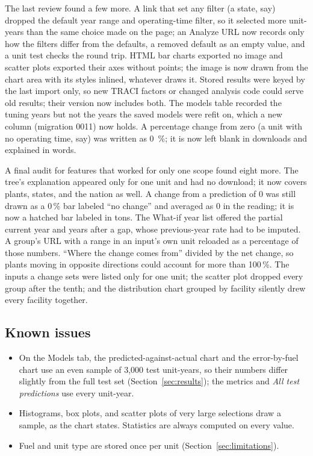 \documentclass[11pt,a4paper]{article}
\begin{document}
The last review found a few more. A link that set any filter (a state, say) dropped the default
year range and operating-time filter, so it selected more unit-years than the same choice made on
the page; an Analyze URL now records only how the filters differ from the defaults, a removed
default as an empty value, and a unit test checks the round trip. HTML bar charts exported no
image and scatter plots exported their axes without points; the image is now drawn from the
chart area with its styles inlined, whatever draws it. Stored results were keyed by the last
import only, so new TRACI factors or changed analysis code could serve old results; their
version now includes both. The models table recorded the tuning years but not the years the
saved models were refit on, which a new  column (migration 0011) now holds.
A percentage change from zero (a unit with no operating time, say) was written as 0~\%; it
is now left blank in downloads and explained in words.

A final audit for features that worked for only one scope found eight more. The tree's
explanation appeared only for one unit and had no download; it now covers plants, states, and the
nation as well. A change from a prediction of 0 was still drawn as a 0\,\% bar labeled ``no
change'' and averaged as 0 in the reading; it is now a hatched bar labeled in tons. The What-if
year list offered the partial current year and years after a gap, whose previous-year rate had
to be imputed. A group's URL with a range in an input's own unit reloaded as a percentage of
those numbers. ``Where the change comes from'' divided by the net change, so plants moving in
opposite directions could account for more than 100\,\%. The inputs a change sets were listed
only for one unit; the scatter plot dropped every group after the tenth; and the distribution chart grouped
by facility silently drew every facility together.

\subsection{Known issues}
\label{sec:known}

\begin{itemize}
  \item On the Models tab, the predicted-against-actual chart and the error-by-fuel chart use
        an even sample of 3{,}000 test unit-years, so their numbers differ slightly from the full
        test set (Section~\ref{sec:results}); the metrics and \emph{All test predictions} use
        every unit-year.
  \item Histograms, box plots, and scatter plots of very large selections draw a sample, as the
        chart states. Statistics are always computed on every value.
  \item Fuel and unit type are stored once per unit (Section~\ref{sec:limitations}).
\end{itemize}
\end{document}
